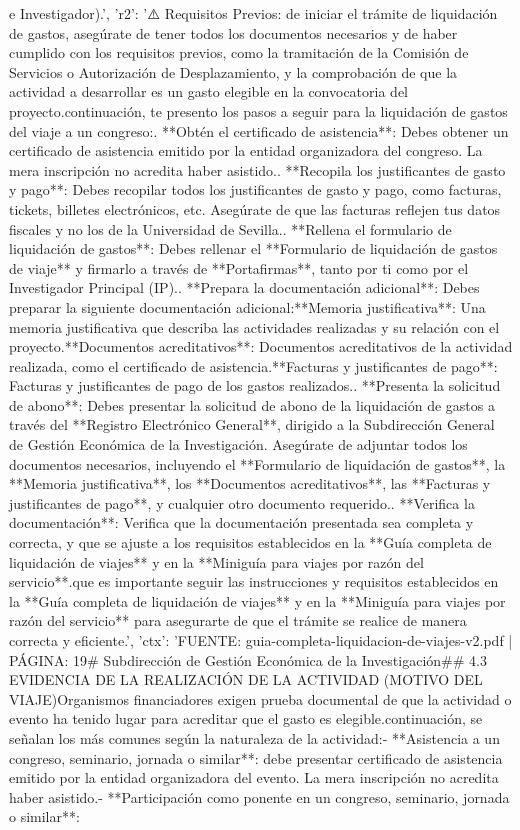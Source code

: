 \documentclass{article}
\begin{document}
\begin{itemize}
e Investigador).', 'r2': '⚠️ Requisitos Previos: \nAntes de iniciar el trámite de liquidación de gastos, asegúrate de tener todos los documentos necesarios y de haber cumplido con los requisitos previos, como la tramitación de la Comisión de Servicios o Autorización de Desplazamiento, y la comprobación de que la actividad a desarrollar es un gasto elegible en la convocatoria del proyecto.\n\nA continuación, te presento los pasos a seguir para la liquidación de gastos del viaje a un congreso:\n{}. **Obtén el certificado de asistencia**: Debes obtener un certificado de asistencia emitido por la entidad organizadora del congreso. La mera inscripción no acredita haber asistido.. **Recopila los justificantes de gasto y pago**: Debes recopilar todos los justificantes de gasto y pago, como facturas, tickets, billetes electrónicos, etc. Asegúrate de que las facturas reflejen tus datos fiscales y no los de la Universidad de Sevilla.. **Rellena el formulario de liquidación de gastos**: Debes rellenar el **Formulario de liquidación de gastos de viaje** y firmarlo a través de **Portafirmas**, tanto por ti como por el Investigador Principal (IP).. **Prepara la documentación adicional**: Debes preparar la siguiente documentación adicional:\n * **Memoria justificativa**: Una memoria justificativa que describa las actividades realizadas y su relación con el proyecto.\n * **Documentos acreditativos**: Documentos acreditativos de la actividad realizada, como el certificado de asistencia.\n * **Facturas y justificantes de pago**: Facturas y justificantes de pago de los gastos realizados.. **Presenta la solicitud de abono**: Debes presentar la solicitud de abono de la liquidación de gastos a través del **Registro Electrónico General**, dirigido a la Subdirección General de Gestión Económica de la Investigación. Asegúrate de adjuntar todos los documentos necesarios, incluyendo el **Formulario de liquidación de gastos**, la **Memoria justificativa**, los **Documentos acreditativos**, las **Facturas y justificantes de pago**, y cualquier otro documento requerido.. **Verifica la documentación**: Verifica que la documentación presentada sea completa y correcta, y que se ajuste a los requisitos establecidos en la **Guía completa de liquidación de viajes** y en la **Miniguía para viajes por razón del servicio**.\n\nRecuerda que es importante seguir las instrucciones y requisitos establecidos en la **Guía completa de liquidación de viajes** y en la **Miniguía para viajes por razón del servicio** para asegurarte de que el trámite se realice de manera correcta y eficiente.', 'ctx': 'FUENTE: guia-completa-liquidacion-de-viajes-v2.pdf | PÁGINA: 19\n# Subdirección de Gestión Económica de la Investigación\n\n## 4.3 EVIDENCIA DE LA REALIZACIÓN DE LA ACTIVIDAD (MOTIVO DEL VIAJE)\n\nLos Organismos financiadores exigen prueba documental de que la actividad o evento ha tenido lugar para acreditar que el gasto es elegible.\n\nA continuación, se señalan los más comunes según la naturaleza de la actividad:\n\n- **Asistencia a un congreso, seminario, jornada o similar**: debe presentar certificado de asistencia emitido por la entidad organizadora del evento. La mera inscripción no acredita haber asistido.\n- **Participación como ponente en un congreso, seminario, jornada o similar**: 
\end{itemize}
\end{document}
